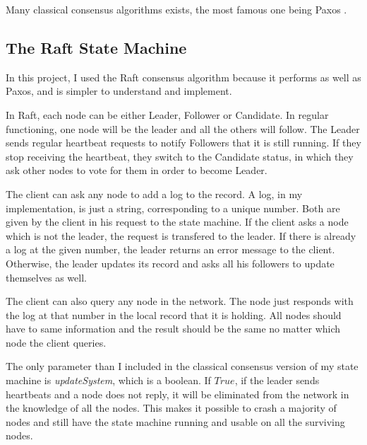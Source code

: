 \documentclass[11pt, twocolumn]{article}
\begin{document}
Many classical consensus algorithms exists, the most famous one being Paxos \cite{parliament}. 
\subsection{The Raft State Machine}
In this project, I used the Raft consensus algorithm \cite{understandable} because it performs as well as Paxos, and is simpler to understand and implement.

In Raft, each node can be either Leader, Follower or Candidate. In regular functioning, one node will be the leader and all the others will follow.
The Leader sends regular heartbeat requests to notify Followers that it is still running. If they stop receiving the heartbeat, they switch to the Candidate status, in which they ask other nodes to vote for them in order to become Leader.

The client can ask any node to add a log to the record. A log, in my implementation, is just a string, corresponding to a unique number. Both are given by the client in his request to the state machine.
If the client asks a node which is not the leader, the request is transfered to the leader. If there is already a log at the given number,
the leader returns an error message to the client. Otherwise, the leader updates its record and asks all his followers to update themselves as well.

The client can also query any node in the network. The node just responds with the log at that number in the local record that it is holding. All nodes should have to same information and the result should be the same no matter which node the client queries.

The only parameter than I included in the classical consensus version of my state machine is \emph{updateSystem}, which is a boolean. If $True$, if the leader sends heartbeats and a node does not reply, 
it will be eliminated from the network in the knowledge of all the nodes. This makes it possible to
crash a majority of nodes and still have the state machine running and usable on all the surviving nodes. 


\end{document}
